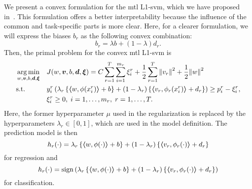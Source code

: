 We present a convex formulation for the \acrshort{mtl} L1-\acrshort{svm}, which we have proposed in~\cite{RuizAD19}. This formulation offers a better interpretability because the influence of the common and task-specific parts is more clear. 
%
Here, for a clearer formulation, we will express the biases $b_r$ as the following convex combination:
$$ b_r = \lambda b + (1 - \lambda) d_r .$$  
%
Then, the primal problem for the convex \acrshort{mtl} L1-\acrshort{svm} is
\begin{equation}\label{eq:svmmtl_primal_convex}
    \begin{aligned}
    & \argmin_{w, \fv{v}, b, \fv{d}, \fv{\xi}}
    & & {J({w}, \fv{v}, b, \fv{d}, \fv{\xi}) = C \sum_{r= 1}^T \sum_{i=1}^{m_r} {\xi_{i}^r} + \frac{1}{2} \sum_{r= 1}^T{\norm{{v}_r}^2} + \frac{1}{2} {\norm{{w}}}^2} \\
    & \text{s.t.}
    & & y_{i}^r \left(\lambda_r \left\lbrace \dotp{w}{\phi(x_{i}^r)} + b  \right\rbrace + (1 - \lambda_r) \left\lbrace \dotp{{v}_r}{\phi_r(x_{i}^r)} + d_r \right\rbrace  \right) \geq p_{i}^r - \xi_{i}^r ,  \\
    & & & \xi_{i}^r \geq 0, \;  i=1 , \dotsc , m_r, \;  r= 1,\dotsc, T  . \\
    \end{aligned}
\end{equation}
Here, the former hyperparameter $\mu$ used in the regularization is replaced by the hyperparameters $\lambda_r \in [0, 1]$, which are used in the model definition. The prediction model is then
\begin{equation}
    \nonumber
    h_r({\cdot}) = \lambda_r \left\lbrace \bm{\left\langle} w, \phi(\cdot) \bm{\right\rangle} + b  \right\rbrace + (1 - \lambda_r) \left\lbrace \bm{\left\langle} {v}_r, \phi_r(\cdot) \bm{\right\rangle} + d_r \right\rbrace
\end{equation}
for regression and 
\begin{equation}
    \nonumber
    h_r({\cdot}) = \operatorname{sign}{ \left(\lambda_r \left\lbrace \bm{\left\langle} w, \phi(\cdot) \bm{\right\rangle} + b  \right\rbrace + (1 - \lambda_r) \left\lbrace \bm{\left\langle} {v}_r, \phi_r(\cdot) \bm{\right\rangle} + d_r \right\rbrace \right)}
\end{equation}
for classification.
%

